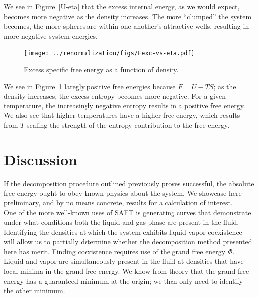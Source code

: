 \documentclass[12pt]{article}
\begin{document}
We see in Figure~\ref{U-eta} that the excess internal energy, as we would expect, becomes more negative as the density increases. The more ``clumped'' the system becomes, the more spheres are within one another's attractive wells, resulting in more negative system energies. 
\begin{figure}[h]
\centering
    \texttt{[image: ../renormalization/figs/Fexc-vs-eta.pdf]}
    \caption{Excess specific free energy as a function of density.}
    \label{F-eta}
\end{figure}
We see in Figure~\ref{F-eta} laregly positive free energies because $F = U -TS$; as the density increases, the excess entropy becomes more negative. For a given temperature, the increasingly negative entropy results in a positive free energy. We also see that higher temperatures have a higher free energy, which results from $T$ scaling the strength of the entropy contribution to the free energy.\\



\section{Discussion}
If the decomposition procedure outlined previously proves successful, the absolute free energy ought to obey known physics about the system. We showcase here preliminary, and by no means concrete, results for a calculation of interest.\\  

One of the more well-known uses of SAFT is generating curves that demonstrate under what conditions both the liquid and gas phase are present in the fluid. Identifying the densities at which the system exhibits liquid-vapor coexistence will allow us to partially determine whether the decomposition method presented here has merit. Finding coexistence requires use of the grand free energy $\Phi$. Liquid and vapor are simultaneously present in the fluid at densities that have local minima in the grand free energy. We know from theory that the grand free energy has a guaranteed minimum at the origin\cite{theoryofcrits}; we then only need to identify the other minimum. \\
\end{document}
